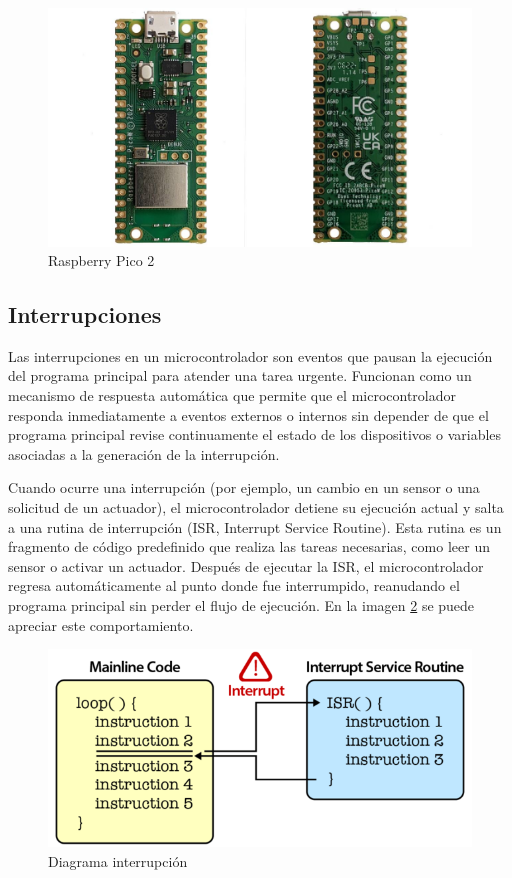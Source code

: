 \begin{figure}[h!]
	\caption{Raspberry Pico 2}
	\label{raspberry}
	\centering
    \includegraphics[width=0.6\linewidth]{raspberry_pico2.jpg}
\end{figure}


\subsection{Interrupciones}
Las interrupciones en un microcontrolador son eventos que pausan la ejecución del programa principal para atender una tarea urgente. Funcionan como un mecanismo de respuesta automática que permite que el microcontrolador responda inmediatamente a eventos externos o internos sin depender de que el programa principal revise continuamente el estado de los dispositivos o variables asociadas a la generación de la interrupción.

Cuando ocurre una interrupción (por ejemplo, un cambio en un sensor o una solicitud de un actuador), el microcontrolador detiene su ejecución actual y salta a una rutina de interrupción (ISR, Interrupt Service Routine). Esta rutina es un fragmento de código predefinido que realiza las tareas necesarias, como leer un sensor o activar un actuador. Después de ejecutar la ISR, el microcontrolador regresa automáticamente al punto donde fue interrumpido, reanudando el programa principal sin perder el flujo de ejecución. En la imagen \ref{interrupt} se puede apreciar este comportamiento.

\begin{figure}[h!]
	\centering
    \includegraphics[width=0.7\linewidth]{components_interrupt.png}
    \caption{Diagrama interrupción}
    \label{interrupt}
\end{figure}


